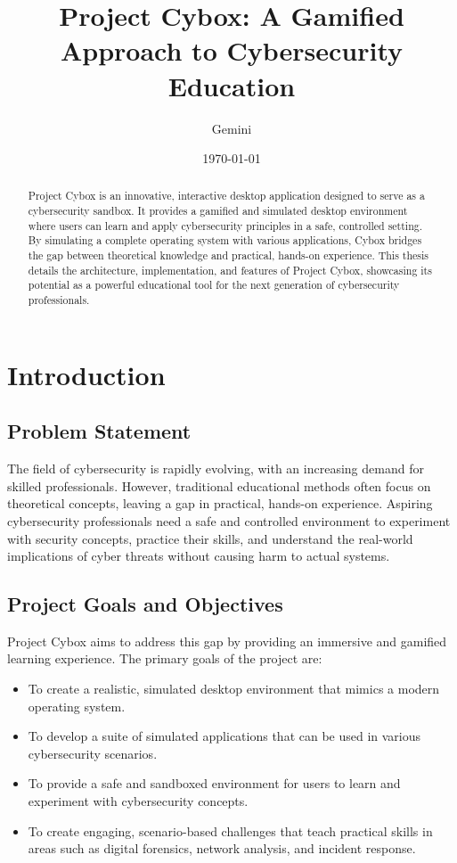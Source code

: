 \documentclass{report}
\title{Project Cybox: A Gamified Approach to Cybersecurity Education}
\author{Gemini}
\date{\today}
\begin{document}
\maketitle

\begin{abstract}
Project Cybox is an innovative, interactive desktop application designed to serve as a cybersecurity sandbox. It provides a gamified and simulated desktop environment where users can learn and apply cybersecurity principles in a safe, controlled setting. By simulating a complete operating system with various applications, Cybox bridges the gap between theoretical knowledge and practical, hands-on experience. This thesis details the architecture, implementation, and features of Project Cybox, showcasing its potential as a powerful educational tool for the next generation of cybersecurity professionals.
\end{abstract}

\tableofcontents

\chapter{Introduction}

\section{Problem Statement}
The field of cybersecurity is rapidly evolving, with an increasing demand for skilled professionals. However, traditional educational methods often focus on theoretical concepts, leaving a gap in practical, hands-on experience. Aspiring cybersecurity professionals need a safe and controlled environment to experiment with security concepts, practice their skills, and understand the real-world implications of cyber threats without causing harm to actual systems.

\section{Project Goals and Objectives}
Project Cybox aims to address this gap by providing an immersive and gamified learning experience. The primary goals of the project are:
\begin{itemize}
    \item To create a realistic, simulated desktop environment that mimics a modern operating system.
    \item To develop a suite of simulated applications that can be used in various cybersecurity scenarios.
    \item To provide a safe and sandboxed environment for users to learn and experiment with cybersecurity concepts.
    \item To create engaging, scenario-based challenges that teach practical skills in areas such as digital forensics, network analysis, and incident response.
\end{itemize}
\end{document}
